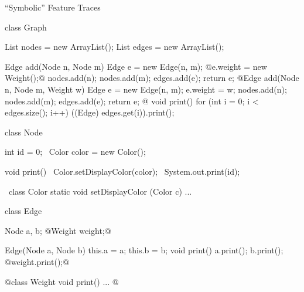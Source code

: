 \begin{frame}[fragile]{``Symbolic'' Feature Traces}
	\small
	\begin{mycolumns}[t,columns=3,widths={43,30,32}]
\begin{codetight}{}
class Graph {
	List nodes = new ArrayList();
	List edges = new ArrayList();

	Edge add(Node n, Node m) {
		Edge e = new Edge(n, m);
		@e.weight = new Weight();@
		nodes.add(n); nodes.add(m); edges.add(e);
		return e;
	}
	@Edge add(Node n, Node m, Weight w) {
		Edge e = new Edge(n, m);
		e.weight = w;
		nodes.add(n); nodes.add(m); edges.add(e);
		return e;
	}@
	void print() {
		for (int i = 0; i < edges.size(); i++) {
			((Edge) edges.get(i)).print();
		}
	}
}
\end{codetight}
	\mynextcolumn
\begin{codetight}{}
class Node {
	int id = 0;
	~Color color = new Color();~

	void print() {
		~Color.setDisplayColor(color);~
		System.out.print(id);
	}
}
\end{codetight}
\begin{codetight}{}
~class Color {
	static void setDisplayColor
		(Color c) {...}
}~
\end{codetight}
	\mynextcolumn
\begin{codetight}{}
class Edge {
	Node a, b;
	@Weight weight;@

	Edge(Node a, Node b) {
		this.a = a; this.b = b;
	}
	void print() {
		a.print(); b.print();
		@weight.print();@
	}
}
\end{codetight}
\begin{codetight}{}
@class Weight {
	void print() {...}
}@
\end{codetight}
	\end{mycolumns}
\end{frame}

